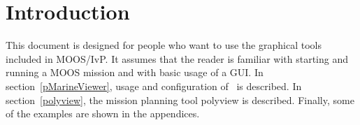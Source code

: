 \section{Introduction}
\label{into}
This document is designed for people who want to use the graphical tools included in MOOS/IvP.  It assumes that the reader is familiar with starting and running a MOOS mission and with basic usage of a GUI.  In section~\ref{pMarineViewer}, usage and configuration of \pmv\ is described.  In section~\ref{polyview}, the mission planning tool polyview is described.  Finally, some of the examples are shown in the appendices.
